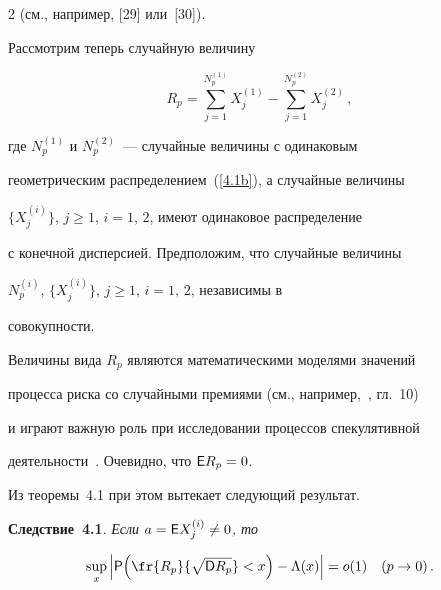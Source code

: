 \begin{multicols}{2}
(см., например, [29] или~[30]).





\smallskip





Рассмотрим теперь случайную величину


$$


R_p=\sum_{j=1}^{N^{(1)}_p}X^{(1)}_j-\sum_{j=1}^{N^{(2)}_p}X^{(2)}_j\,,


$$


где $N^{(1)}_p$ и $N^{(2)}_p$~--- случайные величины с одинаковым


геометрическим распределением~(\ref{4.1b}), а случайные величины


$\{X^{(i)}_j\}$, $j\ge1$, $i=1,\,2$, имеют одинаковое распределение


с конечной дисперсией. Предположим, что случайные величины


$N^{(i)}_p$, $\{X^{(i)}_j\}$, $j\ge1$, $i=1,\,2$, независимы в


совокупности.





Величины вида $R_p$ являются математическими моделями значений


процесса риска со случайными премиями (см., например,~\cite{12be}, гл.~10)


и играют важную роль при исследовании процессов спекулятивной


деятельности~\cite{1be}. Очевидно, что ${\sf E}R_p=0$.





Из теоремы~4.1 при этом вытекает следующий результат.





\medskip





\noindent


{\bf Следствие~4.1}. {\it Если $a={\sf E}X^{(i)}_j\neq 0$, то}


$$


\sup_x\Big|{\sf P}\Big(\fr{R_p}{\sqrt{{\sf


D}R_p}}<x\Big)-\Lambda(x)\Big|=o(1)\quad (p\to0)\,.


$$





\smallskip






\end{multicols}
